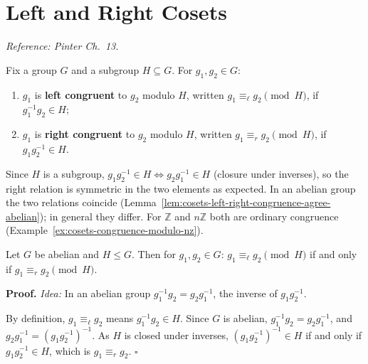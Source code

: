 \documentclass[11pt]{report}
\renewenvironment{proof}[1][Proof]{\noindent\textbf{#1.} }{\hfill$\square$\par\vspace{5pt}}
\begin{document}
\section{Left and Right Cosets}\label{sec:cosets}

\textit{Reference: Pinter Ch.\ 13.}

\begin{defbox}\label{def:congruence-modulo-subgroup}
Fix a group $G$ and a subgroup $H \subseteq G$. For $g_1, g_2 \in G$:
\begin{enumerate}
    \item $g_1$ is \textbf{left congruent} to $g_2$ modulo $H$, written $g_1 \equiv_\ell g_2 \pmod H$, if $g_1^{-1} g_2 \in H$;
    \item $g_1$ is \textbf{right congruent} to $g_2$ modulo $H$, written $g_1 \equiv_r g_2 \pmod H$, if $g_1 g_2^{-1} \in H$.
\end{enumerate}
\end{defbox}

\begin{rembox}\label{rem:why-two-definitions-when-they-agree}
Since $H$ is a subgroup, $g_1 g_2^{-1} \in H \iff g_2 g_1^{-1} \in H$ (closure under inverses), so the right relation is symmetric in the two elements as expected. In an abelian group the two relations coincide (Lemma~\ref{lem:cosets-left-right-congruence-agree-abelian}); in general they differ. For $\mathbb{Z}$ and $n\mathbb{Z}$ both are ordinary congruence (Example~\ref{ex:cosets-congruence-modulo-nz}).
\end{rembox}

\begin{lembox}\label{lem:cosets-left-right-congruence-agree-abelian}
Let $G$ be abelian and $H \leq G$. Then for $g_1, g_2 \in G$: $g_1 \equiv_\ell g_2 \pmod H$ if and only if $g_1 \equiv_r g_2 \pmod H$.
\end{lembox}

\begin{proof}
\textit{Idea:} In an abelian group $g_1^{-1}g_2 = g_2g_1^{-1}$, the inverse of $g_1g_2^{-1}$.\par
By definition, $g_1 \equiv_\ell g_2$ means $g_1^{-1}g_2 \in H$. Since $G$ is abelian, $g_1^{-1}g_2 = g_2 g_1^{-1}$, and $g_2g_1^{-1} = (g_1g_2^{-1})^{-1}$. As $H$ is closed under inverses, $(g_1g_2^{-1})^{-1} \in H$ if and only if $g_1g_2^{-1} \in H$, which is $g_1 \equiv_r g_2$.
\end{proof}
\end{document}
